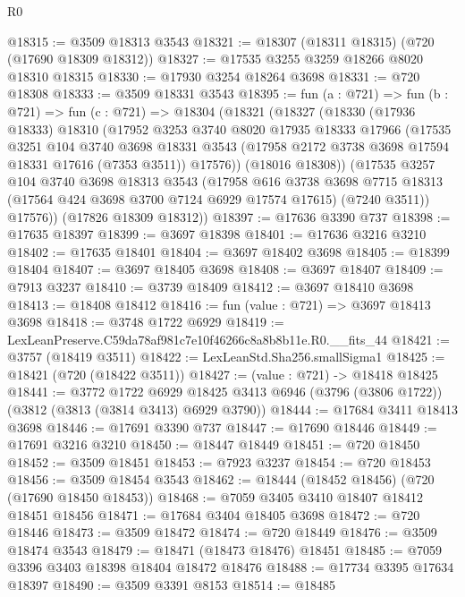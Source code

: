 \begin{lexlean}{R0}
\begin{coremodule}
@18315 := @3509 @18313 @3543
@18321 := @18307 (@18311 @18315) (@720 (@17690 @18309 @18312))
@18327 := @17535 @3255 @3259 @18266 @8020 @18310 @18315
@18330 := @17930 @3254 @18264 @3698
@18331 := @720 @18308
@18333 := @3509 @18331 @3543
@18395 := fun (a : @721) =>
  fun (b : @721) =>
  fun (c : @721) =>
  @18304
    (@18321
      (@18327
        (@18330
          (@17936 @18333)
          @18310
          (@17952
            @3253
            @3740
            @8020
            @17935
            @18333
            @17966
            (@17535
              @3251
              @104
              @3740
              @3698
              @18331
              @3543
              (@17958 @2172 @3738 @3698 @17594 @18331 @17616 (@7353 @3511))
              @17576))
          (@18016 @18308))
        (@17535
          @3257
          @104
          @3740
          @3698
          @18313
          @3543
          (@17958
            @616
            @3738
            @3698
            @7715
            @18313
            (@17564 @424 @3698 @3700 @7124 @6929 @17574 @17615)
            (@7240 @3511))
          @17576))
      (@17826 @18309 @18312))
@18397 := @17636 @3390 @737
@18398 := @17635 @18397
@18399 := @3697 @18398
@18401 := @17636 @3216 @3210
@18402 := @17635 @18401
@18404 := @3697 @18402 @3698
@18405 := @18399 @18404
@18407 := @3697 @18405 @3698
@18408 := @3697 @18407
@18409 := @7913 @3237
@18410 := @3739 @18409
@18412 := @3697 @18410 @3698
@18413 := @18408 @18412
@18416 := fun (value : @721) => @3697 @18413 @3698
@18418 := @3748 @1722 @6929
@18419 := LexLeanPreserve.C59da78af981c7e10f46266c8a8b8b11e.R0.__fits_44
@18421 := @3757 (@18419 @3511)
@18422 := LexLeanStd.Sha256.smallSigma1
@18425 := @18421 (@720 (@18422 @3511))
@18427 := (value : @721) -> @18418 @18425
@18441 := @3772
    @1722
    @6929
    @18425
    @3413
    @6946
    (@3796 (@3806 @1722))
    (@3812 (@3813 (@3814 @3413) @6929 @3790))
@18444 := @17684 @3411 @18413 @3698
@18446 := @17691 @3390 @737
@18447 := @17690 @18446
@18449 := @17691 @3216 @3210
@18450 := @18447 @18449
@18451 := @720 @18450
@18452 := @3509 @18451
@18453 := @7923 @3237
@18454 := @720 @18453
@18456 := @3509 @18454 @3543
@18462 := @18444 (@18452 @18456) (@720 (@17690 @18450 @18453))
@18468 := @7059 @3405 @3410 @18407 @18412 @18451 @18456
@18471 := @17684 @3404 @18405 @3698
@18472 := @720 @18446
@18473 := @3509 @18472
@18474 := @720 @18449
@18476 := @3509 @18474 @3543
@18479 := @18471 (@18473 @18476) @18451
@18485 := @7059 @3396 @3403 @18398 @18404 @18472 @18476
@18488 := @17734 @3395 @17634 @18397
@18490 := @3509 @3391 @8153
@18514 := @18485

\end{coremodule}
\end{lexlean}
